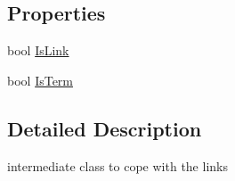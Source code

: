 \subsection*{Properties}
\begin{DoxyCompactItemize}
\item 
bool \hyperlink{class_e_u_cases_1_1_e_u_links_checker_word_add_in_1_1_e_u_links_checker_add_in_1_1r_url_af220e6311a71007a58b0827bd1054845}{Is\+Link}
\item 
bool \hyperlink{class_e_u_cases_1_1_e_u_links_checker_word_add_in_1_1_e_u_links_checker_add_in_1_1r_url_a5cffe466f83b54006a021a88038390ee}{Is\+Term}
\end{DoxyCompactItemize}


\subsection{Detailed Description}
intermediate class to cope with the links 



